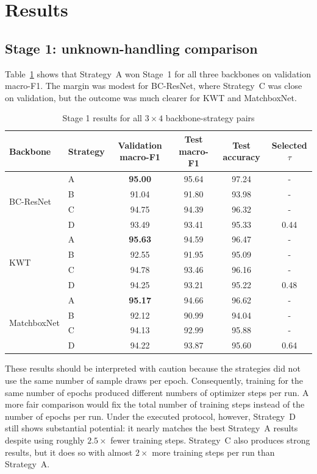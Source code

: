 \documentclass[11pt]{article}
\begin{document}
\section{Results}
\label{sec:results}
\subsection*{Stage 1: unknown-handling comparison}
Table~\ref{tab:stage1-results} shows that Strategy~A won Stage~1 for all three backbones on validation macro-F1. The margin was modest for BC-ResNet, where Strategy~C was close on validation, but the outcome was much clearer for KWT and MatchboxNet. 

\begin{table}[b!]
\centering
\caption{Stage 1 results for all \(3\times4\) backbone-strategy pairs}
\label{tab:stage1-results}
\smallskip
\small
\begin{tabular}{@{}llcccc@{}}
\toprule
\textbf{Backbone} & \textbf{Strategy} & \textbf{Validation macro-F1} & \textbf{Test macro-F1} & \textbf{Test accuracy} & \textbf{Selected \(\tau\)}\\
\midrule
\multirow{4}{*}{BC-ResNet}
 & A & \textbf{95.00} & 95.64 & 97.24 & - \\
 & B & 91.04 & 91.80 & 93.98 & - \\
 & C & 94.75 & 94.39 & 96.32 & - \\
 & D & 93.49 & 93.41 & 95.33 & 0.44 \\
\midrule
\multirow{4}{*}{KWT}
 & A & \textbf{95.63} & 94.59 & 96.47 & - \\
 & B & 92.55 & 91.95 & 95.09 & - \\
 & C & 94.78 & 93.46 & 96.16 & - \\
 & D & 94.25 & 93.21 & 95.22 & 0.48 \\
\midrule
\multirow{4}{*}{MatchboxNet}
 & A & \textbf{95.17} & 94.66 & 96.62 & - \\
 & B & 92.12 & 90.99 & 94.04 & - \\
 & C & 94.13 & 92.99 & 95.88 & - \\
 & D & 94.22 & 93.87 & 95.60 & 0.64 \\
\bottomrule
\end{tabular}
\end{table}

These results should be interpreted with caution because the strategies did not use the same number of sample draws per epoch. Consequently, training for the same number of epochs produced different numbers of optimizer steps per run. A more fair comparison would fix the total number of training steps instead of the number of epochs per run. Under the executed protocol, however, Strategy~D still shows substantial potential: it nearly matches the best Strategy~A results despite using roughly \(2.5\times\) fewer training steps. Strategy~C also produces strong results, but it does so with almost \(2\times\) more training steps per run than Strategy~A.
\end{document}
